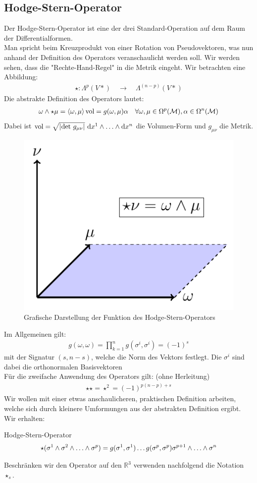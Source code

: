 \subsection{Hodge-Stern-Operator}
Der Hodge-Stern-Operator ist eine der drei Standard-Operation auf dem Raum der Differentialformen. \\
Man spricht beim Kreuzprodukt von einer Rotation von Pseudovektoren, was nun anhand der Definition des Operators veranschaulicht werden soll. Wir werden sehen, dass die "Rechte-Hand-Regel" in die Metrik eingeht.
Wir betrachten eine Abbildung:
\begin{align*}
\star : \Lambda^p(V*) \quad \rightarrow \quad  \Lambda^{(n-p)}(V*) 
\end{align*}
Die abstrakte Definition des Operators lautet:
\begin{align}
\omega \wedge \star \mu = \left<\omega,\mu \right>\text{vol} = g(\omega,\mu)\alpha \quad \forall \omega, \mu \in \Omega^p(\mathcal{M}), \alpha \in \Omega^n(\mathcal{M})
\end{align}
Dabei ist $\text{vol} = \sqrt{\abs{\text{det} \ g_{\mu\nu}}} \ \dd x^1 \w \dots \w \dd x^n$ die Volumen-Form und $g_{\mu\nu}$ die Metrik. \\

\begin{figure}[H]
\centering
\includegraphics[width=.3\linewidth]{figures/darstellung-hodge.pdf}
\caption{Grafische Darstellung der Funktion des Hodge-Stern-Operators}
\end{figure}

Im Allgemeinen gilt:
 \begin{align}
 g(\omega,\omega) = \prod_{k=1}^{n} g(\sigma^{i},\sigma^{i}) = (-1)^s
 \end{align}
 mit der Signatur $(s,n-s)$, welche die Norm des Vektors festlegt. Die $\sigma^{i}$ sind dabei die orthonormalen Basisvektoren \\
 Für die zweifache Anwendung des Operators gilt: (ohne Herleitung)
 \begin{align}
 \star \star = \star^2 = (-1)^{p(n-p)+s}
 \end{align}
 Wir wollen mit einer etwas anschaulicheren, praktischen Definition arbeiten, welche sich durch kleinere Umformungen aus der abstrakten Definition ergibt. Wir erhalten:
\begin{mybox}{Hodge-Stern-Operator}
\begin{align}
\star(\sigma^1 \w \sigma^2 \w \dots \w \sigma^p) = g(\sigma^1,\sigma^1)\dots g(\sigma^p,\sigma^p) \sigma^{p+1}\w \dots \w \sigma^n
\end{align}
\end{mybox}
Beschränken wir den Operator auf den $\mathbb{R}^3$ verwenden nachfolgend die Notation $\star_s$.
